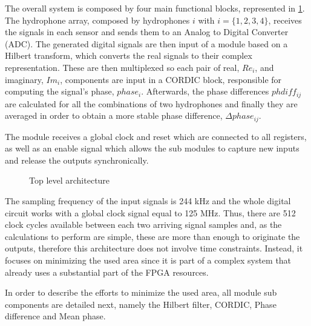 The overall system is composed by four main functional blocks, represented in \ref{fig:module-all}. The hydrophone array, composed by hydrophones $i$ with $i=\{1,2,3,4\}$, receives the signals in each sensor and sends them to an Analog to Digital Converter (ADC). The generated digital signals are then input of a module based on a Hilbert transform, which converts the real signals to their complex representation. These are then multiplexed so each pair of real, $Re_i$, and imaginary, $Im_i$, components are input in a CORDIC \cite{cordic-def} block, responsible for computing the signal's phase, $phase_i$. Afterwards, the phase differences $phdiff_{ij}$ are calculated for all the combinations of two hydrophones and finally they are averaged in order to obtain a more stable phase difference, $\Delta phase_{ij}$.

The module receives a global clock and reset which are connected to all registers, as well as an enable signal which allows the sub modules to capture new inputs and release the outputs synchronically.

\begin{figure}[!htbp]
	\captionsetup{justification=centering,margin=2cm}
	\caption{Top level architecture}
	\label{fig:module-all}
\end{figure}

The sampling frequency of the input signals is 244 kHz and the whole digital circuit works with a global clock signal equal to 125 MHz. Thus, there are 512 clock cycles available between each two arriving signal samples and, as the calculations to perform are simple, these are more than enough to originate the outputs, therefore this architecture does not involve time constraints. Instead, it focuses on minimizing the used area since it is part of a complex system that already uses a substantial part of the FPGA resources.

In order to describe the efforts to minimize the used area, all module sub components are detailed next, namely the Hilbert filter, CORDIC, Phase difference and Mean phase.

